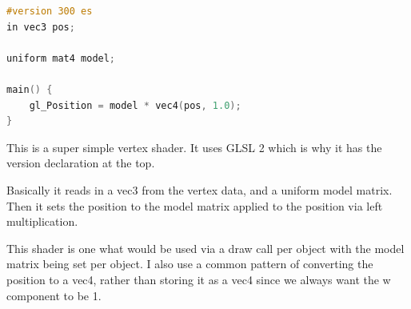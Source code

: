 \documentclass{article}
\begin{document}
\begin{enumerate}
\begin{mdframed}
                \begin{lstlisting}[language=C]
#version 300 es
in vec3 pos;             

uniform mat4 model;

main() {
    gl_Position = model * vec4(pos, 1.0);
}
                \end{lstlisting}

                This is a super simple vertex shader. It uses
                GLSL 2 which is why it has the version declaration
                at the top.

                Basically it reads in a vec3 from the vertex
                data, and a uniform model matrix. Then
                it sets the position to the model matrix
                applied to the position via left multiplication.

                This shader is one what would be used via
                a draw call per object with the model matrix
                being set per object. I also use a common
                pattern of converting the position to a vec4,
                rather than storing it as a vec4 since we
                always want the w component to be 1.
            \end{mdframed}
    \end{enumerate}
\end{document}
